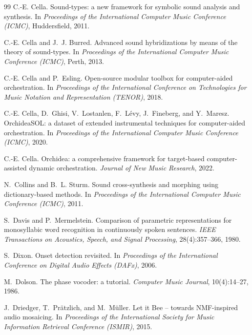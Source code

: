 \documentclass[11pt,a4paper]{article}
\begin{document}
\begin{thebibliography}{99}
C.-E. Cella.
\newblock Sound-types: a new framework for symbolic sound analysis and
  synthesis.
\newblock In \emph{Proceedings of the International Computer Music
  Conference (ICMC)}, Huddersfield, 2011.

C.-E. Cella and J.~J. Burred.
\newblock Advanced sound hybridizations by means of the theory of
  sound-types.
\newblock In \emph{Proceedings of the International Computer Music
  Conference (ICMC)}, Perth, 2013.

C.-E. Cella and P.~Esling.
\newblock Open-source modular toolbox for computer-aided orchestration.
\newblock In \emph{Proceedings of the International Conference on
  Technologies for Music Notation and Representation (TENOR)}, 2018.

C.-E. Cella, D.~Ghisi, V.~Lostanlen, F.~L\'evy, J.~Fineberg, and Y.~Maresz.
\newblock OrchideaSOL: a dataset of extended instrumental techniques for
  computer-aided orchestration.
\newblock In \emph{Proceedings of the International Computer Music
  Conference (ICMC)}, 2020.

C.-E. Cella.
\newblock Orchidea: a comprehensive framework for target-based
  computer-assisted dynamic orchestration.
\newblock \emph{Journal of New Music Research}, 2022.

N.~Collins and B.~L. Sturm.
\newblock Sound cross-synthesis and morphing using dictionary-based methods.
\newblock In \emph{Proceedings of the International Computer Music
  Conference (ICMC)}, 2011.

S.~Davis and P.~Mermelstein.
\newblock Comparison of parametric representations for monosyllabic word
  recognition in continuously spoken sentences.
\newblock \emph{IEEE Transactions on Acoustics, Speech, and Signal
  Processing}, 28(4):357--366, 1980.

S.~Dixon.
\newblock Onset detection revisited.
\newblock In \emph{Proceedings of the International Conference on Digital
  Audio Effects (DAFx)}, 2006.

M.~Dolson.
\newblock The phase vocoder: a tutorial.
\newblock \emph{Computer Music Journal}, 10(4):14--27, 1986.

J.~Driedger, T.~Pr\"atzlich, and M.~M\"uller.
\newblock Let it Bee -- towards NMF-inspired audio mosaicing.
\newblock In \emph{Proceedings of the International Society for Music
  Information Retrieval Conference (ISMIR)}, 2015.


\end{thebibliography}
\end{document}
